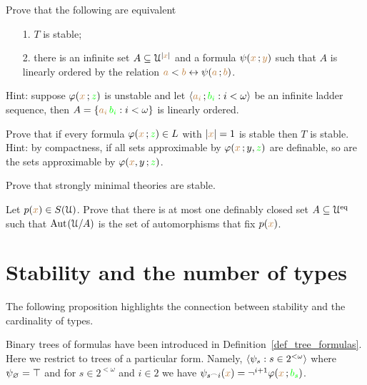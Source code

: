 \documentclass[creche.tex]{subfiles}
\begin{document}
\begin{exercise}\label{ex_stable_orderproperty}
Prove that the following are equivalent
\begin{itemize}
\item[1.] $T$ is stable;
\item[2.] there is an infinite set $A\subseteq\EuScript U^{|{\color{brown} x}|}$ and a formula  $\psi({\color{brown} x}\,;{\color{brown} y})$ such that $A$ is linearly ordered by the relation ${\color{brown} a}<{\color{brown} b}\leftrightarrow\psi({\color{brown} a}\,;{\color{brown} b})$.
\end{itemize}
Hint: suppose $\varphi({\color{brown} x}\,;{\color{green} z})$ is unstable and let $\langle{\color{brown}a_i}\,;{\color{green} b_i} : i<\omega\rangle$ be an infinite ladder sequence, then $A=\{{\color{brown} a_i}\,{\color{green} b_i} : i<\omega\}$ is linearly ordered.\QED
\end{exercise}


\begin{exercise}
Prove that if every formula $\varphi({\color{brown} x}\,;{\color{green} z})\in L$ with $|{\color{brown} x}|=1$ is stable then $T$ is stable. Hint: by compactness, if all sets approximable by $\varphi({\color{brown} x}\,;y,{\color{green} z})$ are definable, so are the sets approximable by $\varphi({\color{brown} x},y\,;{\color{green} z})$.\QED
\end{exercise}


\begin{exercise}
Prove that strongly minimal theories are stable.\QED
\end{exercise}


\begin{exercise}\label{ex_Cb}
Let $p({\color{brown} x})\in S(\EuScript U)$. Prove that there is at most one definably closed set $A\subseteq\EuScript U^{{\rm eq}}$ such that ${\rm Aut\kern.15ex}(\EuScript U/A)$ is the set of automorphisms that fix $p({\color{brown} x})$.\QED
\end{exercise}

\section{Stability and the number of types}

The following proposition highlights the connection between stability and the cardinality of types. 

Binary trees of formulas have been introduced in Definition~\ref{def_tree_formulas}.
Here we restrict to trees of a particular form.
Namely, $\langle\psi_s:s\in 2^{<\omega}\rangle$  where $\psi_\varnothing=\top$ and for $s\in 2^{<\omega}$ and $i\in 2$ we have $\psi_{s^\frown i}({\color{brown} x})=\neg^{i+1}\varphi({\color{brown} x}\,;{\color{green} b_s})$.
\end{document}
